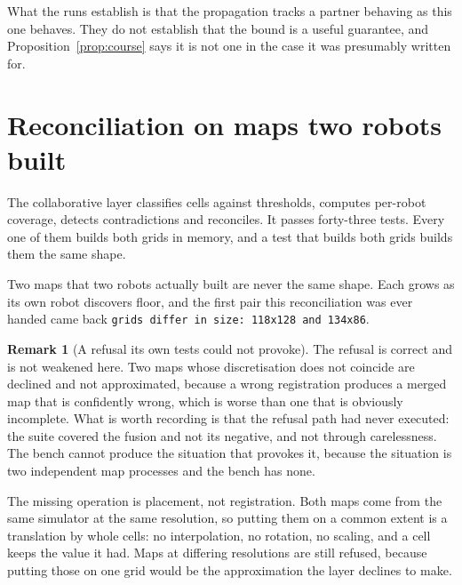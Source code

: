 \documentclass[11pt,a4paper]{article}
\theoremstyle{definition}
\newtheorem{remark}{Remark}
\newcommand{\code}[1]{\texttt{\small #1}}
\begin{document}
What the runs establish is that the propagation tracks a partner behaving as
this one behaves. They do not establish that the bound is a useful guarantee,
and Proposition~\ref{prop:course} says it is not one in the case it was
presumably written for.

\section{Reconciliation on maps two robots built}
\label{sec:reconciliation}

The collaborative layer classifies cells against thresholds, computes per-robot
coverage, detects contradictions and reconciles. It passes forty-three tests.
Every one of them builds both grids in memory, and a test that builds both
grids builds them the same shape.

Two maps that two robots actually built are never the same shape. Each grows as
its own robot discovers floor, and the first pair this reconciliation was ever
handed came back \code{grids differ in size: 118x128 and 134x86}.

\begin{remark}[A refusal its own tests could not provoke]
\label{rem:refusal}
The refusal is correct and is not weakened here. Two maps whose discretisation
does not coincide are declined and not approximated, because a wrong
registration produces a merged map that is confidently wrong, which is worse
than one that is obviously incomplete. What is worth recording is that the
refusal path had never executed: the suite covered the fusion and not its
negative, and not through carelessness. The bench cannot produce the situation
that provokes it, because the situation is two independent map processes and
the bench has none.
\end{remark}

The missing operation is placement, not registration. Both maps come from the
same simulator at the same resolution, so putting them on a common extent is a
translation by whole cells: no interpolation, no rotation, no scaling, and a
cell keeps the value it had. Maps at differing resolutions are still refused,
because putting those on one grid would be the approximation the layer declines
to make.
\end{document}
